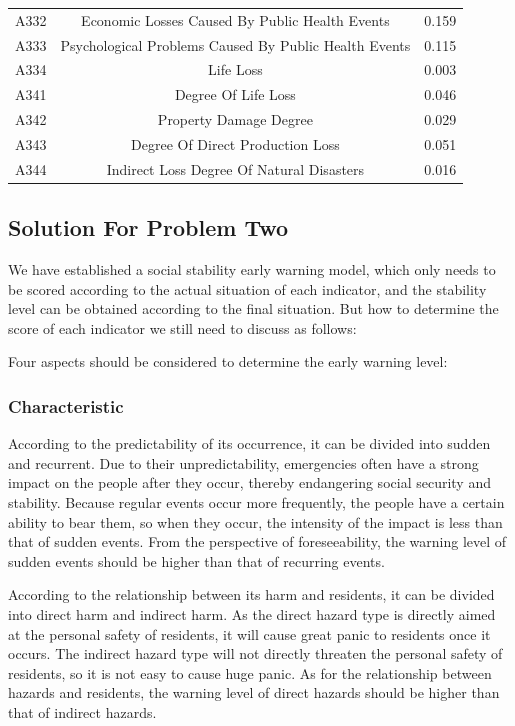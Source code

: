 \documentclass[12pt]{article}  %
\begin{document}
\begin{table}[ht]
{\begin{tabular}{ccc}
        A332 & Economic Losses Caused By Public Health Events &0.159 \\ 
        A333 & Psychological Problems Caused By Public Health Events &0.115 \\ 
        A334 & Life Loss &0.003 \\ 
        A341 & Degree Of Life Loss &0.046\\ 
        A342 & Property Damage Degree&0.029  \\ 
        A343 & Degree Of Direct Production Loss&0.051  \\ 
        A344 & Indirect Loss Degree Of Natural Disasters&0.016  \\ \hline
    \end{tabular}}
\end{table}
\restoregeometry
\subsection{Solution For Problem Two}
We have established a social stability early warning model, which only needs to be scored according to the actual situation of each indicator, and the stability level can be obtained according to the final situation. But how to determine the score of each indicator we still need to discuss as follows:

Four aspects should be considered to determine the early warning level:
\subsubsection{Characteristic}
According to the predictability of its occurrence, it can be divided into sudden and recurrent. Due to their unpredictability, emergencies often have a strong impact on the people after they occur, thereby endangering social security and stability. Because regular events occur more frequently, the people have a certain ability to bear them, so when they occur, the intensity of the impact is less than that of sudden events. From the perspective of foreseeability, the warning level of sudden events should be higher than that of recurring events.

According to the relationship between its harm and residents, it can be divided into direct harm and indirect harm. As the direct hazard type is directly aimed at the personal safety of residents, it will cause great panic to residents once it occurs. The indirect hazard type will not directly threaten the personal safety of residents, so it is not easy to cause huge panic. As for the relationship between hazards and residents, the warning level of direct hazards should be higher than that of indirect hazards.
\end{document}

